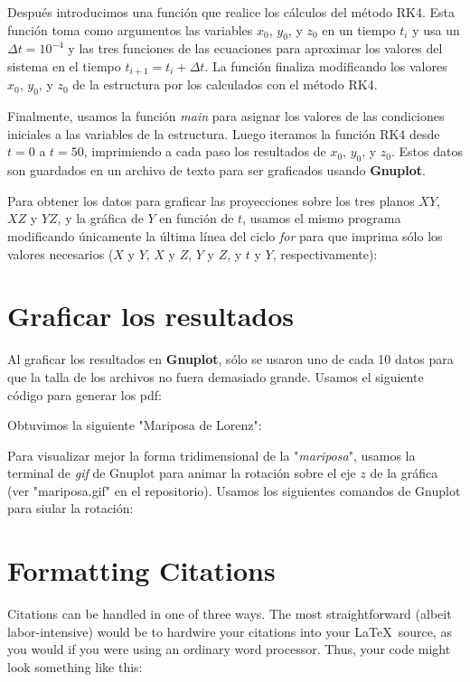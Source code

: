 \documentclass[letterpaper, 12pt]{article}
\begin{document}
{Después introducimos una función que realice los cálculos del método RK4. Esta función toma como argumentos las variables $x_0$, $y_0$, y $z_0$ en un tiempo $t_i$ y usa un $\Delta t = 10^{-4}$ y las tres funciones de las ecuaciones para aproximar los valores del sistema en el tiempo $t_{i+1} = t_i + \Delta t$. La función finaliza modificando los valores $x_0$, $y_0$, y $z_0$ de la estructura por los calculados con el método RK4.

Finalmente, usamos la función \textit{main} para asignar los valores de las condiciones iniciales a las variables de la estructura. Luego iteramos la función RK4 desde $t = 0$ a $t = 50$, imprimiendo a cada paso los resultados de $x_0$, $y_0$, y $z_0$. Estos datos son guardados en un archivo de texto para ser graficados usando \textbf{Gnuplot}.

Para obtener los datos para graficar las proyecciones sobre los tres planos $XY$, $XZ$ y $YZ$, y la gráfica de $Y$ en funci\'on de $t$, usamos el mismo programa modificando \'unicamente la \'ultima l\'inea del ciclo \textit{for} para que imprima s\'olo los valores necesarios ($X$ y $Y$, $X$ y $Z$, $Y$ y $Z$, y $t$ y $Y$, respectivamente):


\section*{Graficar los resultados}

\justify
Al graficar los resultados en \textbf{Gnuplot}, s\'olo se usaron uno de cada 10 datos para que la talla de los archivos no fuera demasiado grande. Usamos el siguiente c\'odigo para generar los pdf:

Obtuvimos la siguiente "Mariposa de Lorenz":
%

Para visualizar mejor la forma tridimensional de la "\textit{mariposa}", usamos la terminal de \textit{gif} de Gnuplot para animar la rotaci\'on sobre el eje $z$ de la gr\'afica (ver "mariposa.gif" en el repositorio). Usamos los siguientes comandos de Gnuplot para siular la rotaci\'on:



\section*{Formatting Citations}

Citations can be handled in one of three ways.  The most
straightforward (albeit labor-intensive) would be to hardwire your
citations into your \LaTeX\ source, as you would if you were using an
ordinary word processor.  Thus, your code might look something like
this:


}
\end{document}
